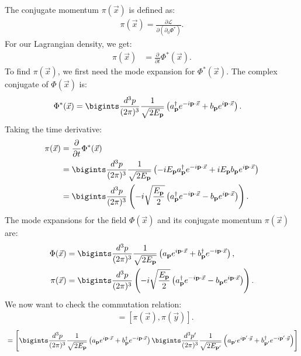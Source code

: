 {The conjugate momentum \(\pi(\vec{x})\) is defined as:
\begin{align}
    \pi(\vec{x}) = \frac{\partial \mathcal{L}}{\partial (\partial_0 \Phi^*)}.
\end{align}
For our Lagrangian density, we get:
\begin{align}
    \pi(\vec{x}) &= \frac{\partial}{\partial t} \Phi^*(\vec{x}).
\end{align}
To find \(\pi(\vec{x})\), we first need the mode expansion for \(\Phi^*(\vec{x})\). The complex conjugate of \(\Phi(\vec{x})\) is:
\begin{align}
    \Phi^*(\vec{x}) &= \bigints\frac{d^3p}{(2\pi)^3} \frac{1}{\sqrt{2E_{\mathbf{p}}}} \left( a^\dagger_{\mathbf{p}} e^{-i \mathbf{p} \cdot \vec{x}} + b_{\mathbf{p}} e^{i \mathbf{p} \cdot \vec{x}} \right).
\end{align}
Taking the time derivative:
\begin{align}
    \pi(\vec{x}) &= \frac{\partial}{\partial t} \Phi^*(\vec{x}) \\
    &= \bigints\frac{d^3p}{(2\pi)^3} \frac{1}{\sqrt{2E_{\mathbf{p}}}} \left( -i E_{\mathbf{p}} a^\dagger_{\mathbf{p}} e^{-i \mathbf{p} \cdot \vec{x}} + i E_{\mathbf{p}} b_{\mathbf{p}} e^{i \mathbf{p} \cdot \vec{x}} \right) \\
    &= \bigints\frac{d^3p}{(2\pi)^3} \left(-i \sqrt{\frac{E_{\mathbf{p}}}{2}} \left( a^\dagger_{\mathbf{p}} e^{-i \mathbf{p} \cdot \vec{x}} - b_{\mathbf{p}} e^{i \mathbf{p} \cdot \vec{x}} \right)\right).
\end{align}
The mode expansions for the field \(\Phi(\vec{x})\) and its conjugate momentum \(\pi(\vec{x})\) are:
\begin{align}
    \Phi(\vec{x}) &= \bigints\frac{d^3p}{(2\pi)^3} \frac{1}{\sqrt{2E_{\mathbf{p}}}} \left( a_{\mathbf{p}} e^{i \mathbf{p} \cdot \vec{x}} + b^\dagger_{\mathbf{p}} e^{-i \mathbf{p} \cdot \vec{x}} \right), \\
    \pi(\vec{x}) &= \bigints\frac{d^3p}{(2\pi)^3} \left(-i \sqrt{\frac{E_{\mathbf{p}}}{2}} \left( a^\dagger_{\mathbf{p}} e^{-i \mathbf{p} \cdot \vec{x}} - b_{\mathbf{p}} e^{i \mathbf{p} \cdot \vec{x}} \right)\right).
\end{align}
We now want to check the commutation relation:
\begin{align}
    [\phi(\vec{x}), \phi(\vec{y})] &= [\pi(\vec{x}), \pi(\vec{y})].
\end{align}
\begin{align*}
    [\phi(\vec{x}), \phi(\vec{y})] &= \left[ \bigints\frac{d^3p}{(2\pi)^3} \frac{1}{\sqrt{2E_{\mathbf{p}}}} \left(a_{\mathbf{p}} e^{i \mathbf{p} \cdot \vec{x}} + b^\dagger_{\mathbf{p}} e^{-i \mathbf{p} \cdot \vec{x}}\right) \bigints\frac{d^3p^\prime}{(2\pi)^3} \frac{1}{\sqrt{2E_{\mathbf{p}^\prime}}} \left(a_{\mathbf{p}^\prime} e^{i \mathbf{p}^\prime \cdot \vec{y}} + b^\dagger_{\mathbf{p}^\prime} e^{-i \mathbf{p}^\prime \cdot \vec{y}}\right) \right] \\

\end{align*}}
